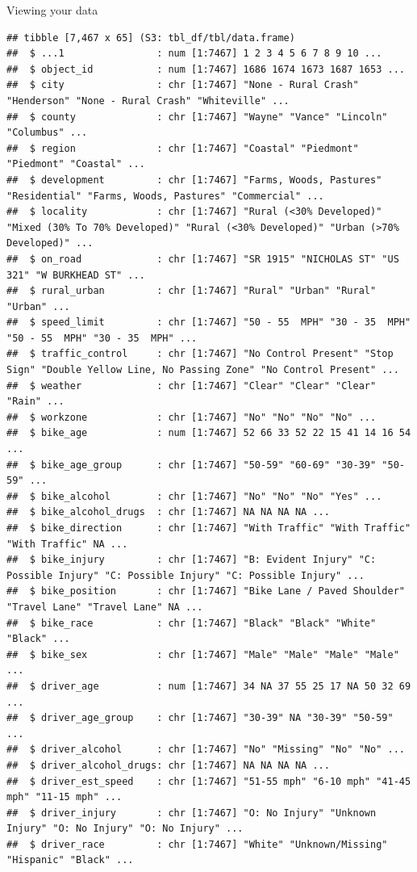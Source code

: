 \documentclass[
  ignorenonframetext,
]{beamer}
\begin{document}
\begin{frame}[fragile]{Viewing your data}
\begin{verbatim}
## tibble [7,467 x 65] (S3: tbl_df/tbl/data.frame)
##  $ ...1                : num [1:7467] 1 2 3 4 5 6 7 8 9 10 ...
##  $ object_id           : num [1:7467] 1686 1674 1673 1687 1653 ...
##  $ city                : chr [1:7467] "None - Rural Crash" "Henderson" "None - Rural Crash" "Whiteville" ...
##  $ county              : chr [1:7467] "Wayne" "Vance" "Lincoln" "Columbus" ...
##  $ region              : chr [1:7467] "Coastal" "Piedmont" "Piedmont" "Coastal" ...
##  $ development         : chr [1:7467] "Farms, Woods, Pastures" "Residential" "Farms, Woods, Pastures" "Commercial" ...
##  $ locality            : chr [1:7467] "Rural (<30% Developed)" "Mixed (30% To 70% Developed)" "Rural (<30% Developed)" "Urban (>70% Developed)" ...
##  $ on_road             : chr [1:7467] "SR 1915" "NICHOLAS ST" "US 321" "W BURKHEAD ST" ...
##  $ rural_urban         : chr [1:7467] "Rural" "Urban" "Rural" "Urban" ...
##  $ speed_limit         : chr [1:7467] "50 - 55  MPH" "30 - 35  MPH" "50 - 55  MPH" "30 - 35  MPH" ...
##  $ traffic_control     : chr [1:7467] "No Control Present" "Stop Sign" "Double Yellow Line, No Passing Zone" "No Control Present" ...
##  $ weather             : chr [1:7467] "Clear" "Clear" "Clear" "Rain" ...
##  $ workzone            : chr [1:7467] "No" "No" "No" "No" ...
##  $ bike_age            : num [1:7467] 52 66 33 52 22 15 41 14 16 54 ...
##  $ bike_age_group      : chr [1:7467] "50-59" "60-69" "30-39" "50-59" ...
##  $ bike_alcohol        : chr [1:7467] "No" "No" "No" "Yes" ...
##  $ bike_alcohol_drugs  : chr [1:7467] NA NA NA NA ...
##  $ bike_direction      : chr [1:7467] "With Traffic" "With Traffic" "With Traffic" NA ...
##  $ bike_injury         : chr [1:7467] "B: Evident Injury" "C: Possible Injury" "C: Possible Injury" "C: Possible Injury" ...
##  $ bike_position       : chr [1:7467] "Bike Lane / Paved Shoulder" "Travel Lane" "Travel Lane" NA ...
##  $ bike_race           : chr [1:7467] "Black" "Black" "White" "Black" ...
##  $ bike_sex            : chr [1:7467] "Male" "Male" "Male" "Male" ...
##  $ driver_age          : num [1:7467] 34 NA 37 55 25 17 NA 50 32 69 ...
##  $ driver_age_group    : chr [1:7467] "30-39" NA "30-39" "50-59" ...
##  $ driver_alcohol      : chr [1:7467] "No" "Missing" "No" "No" ...
##  $ driver_alcohol_drugs: chr [1:7467] NA NA NA NA ...
##  $ driver_est_speed    : chr [1:7467] "51-55 mph" "6-10 mph" "41-45 mph" "11-15 mph" ...
##  $ driver_injury       : chr [1:7467] "O: No Injury" "Unknown Injury" "O: No Injury" "O: No Injury" ...
##  $ driver_race         : chr [1:7467] "White" "Unknown/Missing" "Hispanic" "Black" ...

\end{verbatim}
\end{frame}
\end{document}

